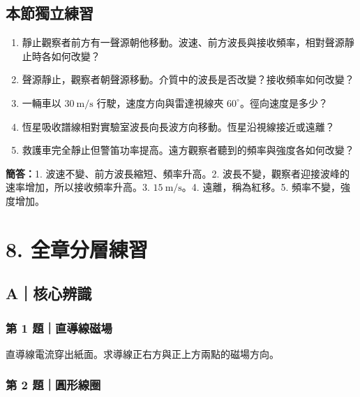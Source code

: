 \documentclass[11pt,a4paper]{article}
\providecommand{\tightlist}{%
  \setlength{\itemsep}{0pt}\setlength{\parskip}{0pt}}
\begin{document}
\begin{HandoutSelfCheck}

\subsection{本節獨立練習}\label{ux672cux7bc0ux7368ux7acbux7df4ux7fd2-6}

\begin{enumerate}
\def\labelenumi{\arabic{enumi}.}
\tightlist
\item
  靜止觀察者前方有一聲源朝他移動。波速、前方波長與接收頻率，相對聲源靜止時各如何改變？
\item
  聲源靜止，觀察者朝聲源移動。介質中的波長是否改變？接收頻率如何改變？
\item
  一輛車以 \(30\ \mathrm{m/s}\) 行駛，速度方向與雷達視線夾 \(60^\circ\)。徑向速度是多少？
\item
  恆星吸收譜線相對實驗室波長向長波方向移動。恆星沿視線接近或遠離？
\item
  救護車完全靜止但警笛功率提高。遠方觀察者聽到的頻率與強度各如何改變？
\end{enumerate}

\textbf{簡答：}1. 波速不變、前方波長縮短、頻率升高。2. 波長不變，觀察者迎接波峰的速率增加，所以接收頻率升高。3. \(15\ \mathrm{m/s}\)。4. 遠離，稱為紅移。5. 頻率不變，強度增加。

\end{HandoutSelfCheck}

\section{8. 全章分層練習}\label{ux5168ux7ae0ux5206ux5c64ux7df4ux7fd2}

\subsection{A｜核心辨識}\label{aux6838ux5fc3ux8fa8ux8b58}

\subsubsection{第 1 題｜直導線磁場}\label{ux7b2c-1-ux984cux76f4ux5c0eux7ddaux78c1ux5834}

直導線電流穿出紙面。求導線正右方與正上方兩點的磁場方向。

\subsubsection{第 2 題｜圓形線圈}\label{ux7b2c-2-ux984cux5713ux5f62ux7ddaux5708}
\end{document}
